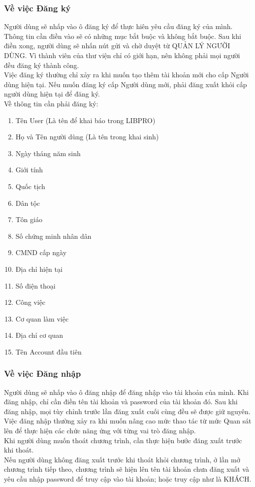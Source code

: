 \documentclass[12pt,a4paper]{report}
\begin{document}
			\subsubsection{Về việc Đăng ký}
			Người dùng sẽ nhấp vào ô đăng ký để thực hiên yêu cầu đăng ký của mình. Thông tin cần điền vào sẽ có những mục bắt buộc và không bắt buộc. Sau khi điền xong, người dùng sẽ nhấn nút gửi và chờ duyệt từ QUẢN LÝ NGƯỜI DÙNG. Vì thành viên của thư viện chỉ có giới hạn, nên không phải mọi người đều đăng ký thành công.\\
			Việc đăng ký thường chỉ xảy ra khi muốn tạo thêm tài khoản mới cho cấp Người dùng hiện tại. Nếu muốn đăng ký cấp Người dùng mới, phải đăng xuất khỏi cấp người dùng hiện tại để đăng ký.\\
			Về thông tin cần phải đăng ký:
			\begin{enumerate}
				\item Tên User (Là tên để khai báo trong LIBPRO)
				\item Họ và Tên người dùng (Là tên trong khai sinh)
				\item Ngày tháng năm sinh
				\item Giới tính
				\item Quốc tịch
				\item Dân tộc
				\item Tôn giáo
				\item Số chứng minh nhân dân
				\item CMND cấp ngày
				\item Địa chỉ hiện tại
				\item Số điện thoại
				\item Công việc
				\item Cơ quan làm việc
				\item Địa chỉ cơ quan
				\item Tên Account đầu tiên
			\end{enumerate}
			\subsubsection{Về việc Đăng nhập}
			Người dùng sẽ nhấp vào ô đăng nhập để đăng nhập vào tài khoản của mình. Khi đăng nhập, chỉ cần điền tên tài khoản và password của tài khoản đó. Sau khi đăng nhập, mọi tùy chỉnh trước lần đăng xuất cuối cùng đều sẽ được giữ nguyên.\\
			Việc đăng nhập thường xảy ra khi muốn nâng cao mức thao tác từ mức Quan sát lên để thực hiện các chức năng ứng với từng vai trò đăng nhập.\\
			Khi người dùng muốn thoát chương trình, cần thực hiện bước đăng xuất trước khi thoát.\\
			Nếu người dùng không đăng xuất trước khi thoát khỏi chương trình, ở lần mở chương trình tiếp theo, chương trình sẽ hiện lên tên tài khoản chưa đăng xuất và yêu cầu nhập password để truy cập vào tài khoản; hoặc truy cập như là KHÁCH.\\
\end{document}

